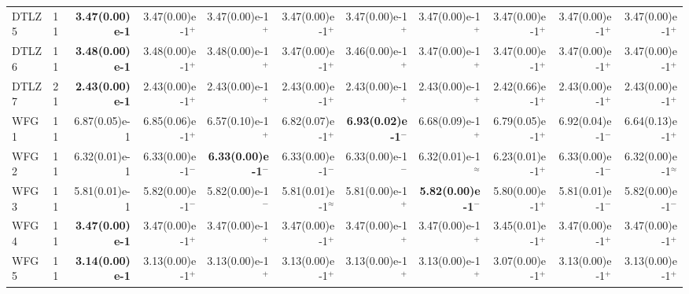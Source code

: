 \documentclass[pdflatex,sn-mathphys-ay]{sn-jnl}%
\theoremstyle{thmstyleone}%
\theoremstyle{thmstyletwo}%
\theoremstyle{thmstylethree}%
\begin{document}
\begin{landscape}
{\begin{longtable}{llrrrrrrrrr}
			DTLZ5                             & 11  & \textbf{3.47(0.00)e-1} & 3.47(0.00)e-1$^{+}$                & 3.47(0.00)e-1$^{+}$          & 3.47(0.00)e-1$^{+}$       & 3.47(0.00)e-1$^{+}$          & 3.47(0.00)e-1$^{+}$                & 3.47(0.00)e-1$^{+}$          & 3.47(0.00)e-1$^{+}$          & 3.47(0.00)e-1$^{+}$       \\
			DTLZ6                             & 11  & \textbf{3.48(0.00)e-1} & 3.48(0.00)e-1$^{+}$                & 3.48(0.00)e-1$^{+}$          & 3.47(0.00)e-1$^{+}$       & 3.46(0.00)e-1$^{+}$          & 3.47(0.00)e-1$^{+}$                & 3.47(0.00)e-1$^{+}$          & 3.47(0.00)e-1$^{+}$          & 3.47(0.00)e-1$^{+}$       \\
			DTLZ7                             & 21  & \textbf{2.43(0.00)e-1} & 2.43(0.00)e-1$^{+}$                & 2.43(0.00)e-1$^{+}$          & 2.43(0.00)e-1$^{+}$       & 2.43(0.00)e-1$^{+}$          & 2.43(0.00)e-1$^{+}$                & 2.42(0.66)e-1$^{+}$          & 2.43(0.00)e-1$^{+}$          & 2.43(0.00)e-1$^{+}$       \\
			\midrule
			WFG1                              & 11  & 6.87(0.05)e-1          & 6.85(0.06)e-1$^{+}$                & 6.57(0.10)e-1$^{+}$          & 6.82(0.07)e-1$^{+}$       & \textbf{6.93(0.02)e-1}$^{-}$ & 6.68(0.09)e-1$^{+}$                & 6.79(0.05)e-1$^{+}$          & 6.92(0.04)e-1$^{-}$          & 6.64(0.13)e-1$^{+}$       \\
			WFG2                              & 11  & 6.32(0.01)e-1          & 6.33(0.00)e-1$^{-}$                & \textbf{6.33(0.00)e-1}$^{-}$ & 6.33(0.00)e-1$^{-}$       & 6.33(0.00)e-1$^{-}$          & 6.32(0.01)e-1$^{\approx}$          & 6.23(0.01)e-1$^{+}$          & 6.33(0.00)e-1$^{-}$          & 6.32(0.00)e-1$^{\approx}$ \\
			WFG3                              & 11  & 5.81(0.01)e-1          & 5.82(0.00)e-1$^{-}$                & 5.82(0.00)e-1$^{-}$          & 5.81(0.01)e-1$^{\approx}$ & 5.81(0.00)e-1$^{+}$          & \textbf{5.82(0.00)e-1}$^{-}$       & 5.80(0.00)e-1$^{+}$          & 5.81(0.01)e-1$^{-}$          & 5.82(0.00)e-1$^{-}$       \\
			WFG4                              & 11  & \textbf{3.47(0.00)e-1} & 3.47(0.00)e-1$^{+}$                & 3.47(0.00)e-1$^{+}$          & 3.47(0.00)e-1$^{+}$       & 3.47(0.00)e-1$^{+}$          & 3.47(0.00)e-1$^{+}$                & 3.45(0.01)e-1$^{+}$          & 3.47(0.00)e-1$^{+}$          & 3.47(0.00)e-1$^{+}$       \\
			WFG5                              & 11  & \textbf{3.14(0.00)e-1} & 3.13(0.00)e-1$^{+}$                & 3.13(0.00)e-1$^{+}$          & 3.13(0.00)e-1$^{+}$       & 3.13(0.00)e-1$^{+}$          & 3.13(0.00)e-1$^{+}$                & 3.07(0.00)e-1$^{+}$          & 3.13(0.00)e-1$^{+}$          & 3.13(0.00)e-1$^{+}$       \\

\end{longtable}}
\end{landscape}
\end{document}
